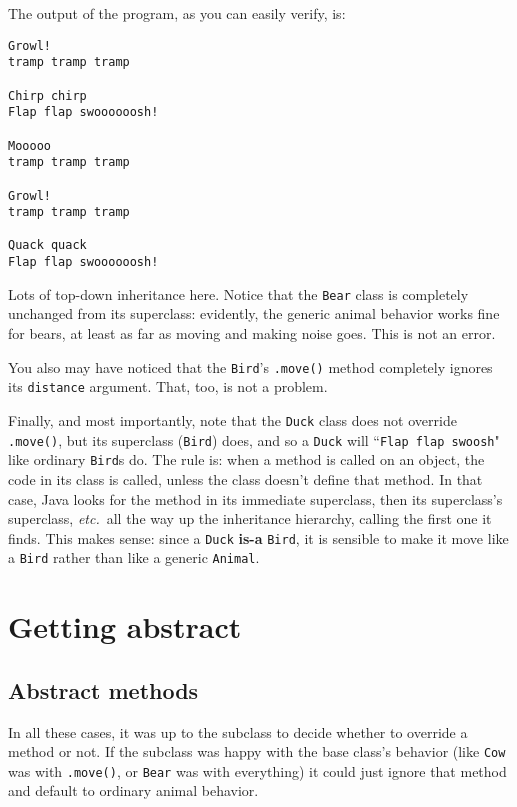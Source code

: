 \begin{samepage}
The output of the program, as you can easily verify, is:

\begin{Verbatim}[fontsize=\footnotesize,samepage=true,frame=single]
Growl!
tramp tramp tramp 

Chirp chirp
Flap flap swoooooosh!

Mooooo
tramp tramp tramp 

Growl!
tramp tramp tramp 

Quack quack
Flap flap swoooooosh!
\end{Verbatim}
\end{samepage}

Lots of top-down inheritance here. Notice that the \texttt{Bear} class is
completely unchanged from its superclass: evidently, the generic animal
behavior works fine for bears, at least as far as moving and making noise
goes. This is not an error.

You also may have noticed that the \texttt{Bird}'s \texttt{.move()} method
completely ignores its \texttt{distance} argument. That, too, is not a
problem.

Finally, and most importantly, note that the \texttt{Duck} class does not
override \texttt{.move()}, but its superclass (\texttt{Bird}) does, and so a
\texttt{Duck} will ``\texttt{Flap flap swoosh}" like ordinary \texttt{Bird}s
do. The rule is: when a method is called on an object, the code in its class
is called, unless the class doesn't define that method. In that case, Java
looks for the method in its immediate superclass, then its superclass's
superclass, \textit{etc.}~all the way up the inheritance hierarchy, calling
the first one it finds. This makes sense: since a \texttt{Duck} \textbf{is-a}
\texttt{Bird}, it is sensible to make it move like a \texttt{Bird} rather than
like a generic \texttt{Animal}.

\section{Getting abstract}

\subsection{Abstract methods}

In all these cases, it was up to the subclass to decide whether to override a
method or not. If the subclass was happy with the base class's behavior (like
\texttt{Cow} was with \texttt{.move()}, or \texttt{Bear} was with everything)
it could just ignore that method and default to ordinary animal behavior.

